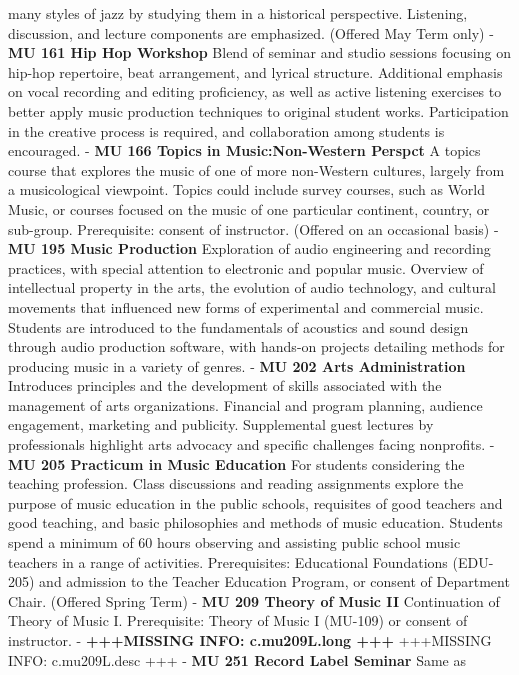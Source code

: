 \documentclass[
  letterpaper,
]{scrbook}
\begin{document}
many styles of jazz by studying them in a historical perspective.
Listening, discussion, and lecture components are emphasized. (Offered
May Term only) - \textbf{MU 161 Hip Hop Workshop} Blend of seminar and
studio sessions focusing on hip-hop repertoire, beat arrangement, and
lyrical structure. Additional emphasis on vocal recording and editing
proficiency, as well as active listening exercises to better apply music
production techniques to original student works. Participation in the
creative process is required, and collaboration among students is
encouraged. - \textbf{MU 166 Topics in Music:Non-Western Perspct} A
topics course that explores the music of one of more non-Western
cultures, largely from a musicological viewpoint. Topics could include
survey courses, such as World Music, or courses focused on the music of
one particular continent, country, or sub-group. Prerequisite: consent
of instructor. (Offered on an occasional basis) - \textbf{MU 195 Music
Production} Exploration of audio engineering and recording practices,
with special attention to electronic and popular music. Overview of
intellectual property in the arts, the evolution of audio technology,
and cultural movements that influenced new forms of experimental and
commercial music. Students are introduced to the fundamentals of
acoustics and sound design through audio production software, with
hands-on projects detailing methods for producing music in a variety of
genres. - \textbf{MU 202 Arts Administration} Introduces principles and
the development of skills associated with the management of arts
organizations. Financial and program planning, audience engagement,
marketing and publicity. Supplemental guest lectures by professionals
highlight arts advocacy and specific challenges facing nonprofits. -
\textbf{MU 205 Practicum in Music Education} For students considering
the teaching profession. Class discussions and reading assignments
explore the purpose of music education in the public schools, requisites
of good teachers and good teaching, and basic philosophies and methods
of music education. Students spend a minimum of 60 hours observing and
assisting public school music teachers in a range of activities.
Prerequisites: Educational Foundations (EDU-205) and admission to the
Teacher Education Program, or consent of Department Chair. (Offered
Spring Term) - \textbf{MU 209 Theory of Music II} Continuation of Theory
of Music I. Prerequisite: Theory of Music I (MU-109) or consent of
instructor. - \textbf{+++MISSING INFO: c.mu209L.long +++} +++MISSING
INFO: c.mu209L.desc +++ - \textbf{MU 251 Record Label Seminar} Same as
\end{document}
